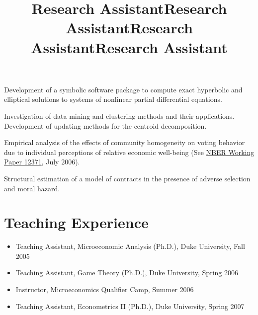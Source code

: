 \documentclass[overlapped,line,letterpaper]{res}
\begin{document}
\begin{resume}
\title{Research Assistant}
\begin{position}
  Development of a symbolic software package to compute exact
  hyperbolic and elliptical solutions to systems of nonlinear partial
  differential equations.
\end{position}

\title{Research Assistant}
\begin{position}
  Investigation of data mining and clustering methods and their
  applications. Development of updating methods for the centroid
  decomposition.
\end{position}

\title{Research Assistant}
\begin{position}
  Empirical analysis of the effects of community homogeneity on voting
  behavior due to individual perceptions of relative economic
  well-being
  (See \href{http://www.nber.org/papers/w12371}{NBER Working Paper 12371},
  July 2006).
\end{position}

\title{Research Assistant}
\begin{position}
  Structural estimation of a model of contracts in the presence of
  adverse selection and moral hazard.
\end{position}


\section{\bf Teaching Experience}

\begin{itemize}
\item Teaching Assistant, Microeconomic Analysis (Ph.D.), Duke
  University, Fall 2005
\item Teaching Assistant, Game Theory (Ph.D.), Duke University, Spring 2006
\item Instructor, Microeconomics Qualifier Camp, Summer 2006
\item Teaching Assistant, Econometrics II (Ph.D.), Duke University, Spring 2007
\end{itemize}


\end{resume}
\end{document}
